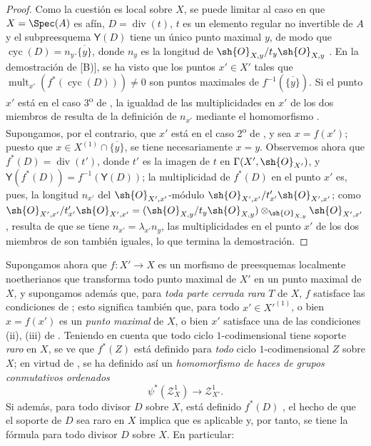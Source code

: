 \begin{proof}
Como la cuestión es local sobre $X$, se puede limitar al caso en que $X=\Spec(A)$ es afín, $D=\operatorname{div}(t)$, $t$ es un elemento regular no invertible de $A$ y el subpreesquema $\boldsymbol{\mathsf{Y}}(D)$  tiene un único punto maximal $y$, de modo que $\operatorname{cyc}(D)=n_y.\overline{\{y\}}$, donde $n_y$ es la longitud de $\sh{O}_{X,y}/t_y\sh{O}_{X,y}$ .
En la demostración de [B)], se ha visto que los puntos $x'\in X'$ tales que $\operatorname{mult}_{x'}(f^*(\operatorname{cyc}(D)))\neq0$ son puntos maximales de $f^{-1}(\overline{\{y\}})$.
Si el punto $x'$ está en el caso 3\textsuperscript{o} de , la igualdad de las multiplicidades en $x'$ de los dos miembros de  resulta de la definición de $n_{x'}$ mediante el homomorfismo .
Supongamos, por el contrario, que $x'$ está en el caso 2\textsuperscript{o} de , y sea $x=f(x')$;
puesto que $x\in X^{(1)}\cap\overline{\{y\}}$, se tiene necesariamente $x=y$.
Observemos ahora que $f^*(D)=\operatorname{div}(t')$, donde $t'$ es la imagen de $t$ en $\Gamma(X',\sh{O}_{X'})$, y $\boldsymbol{\mathsf{Y}}(f^*(D))=f^{-1}(\boldsymbol{\mathsf{Y}}(D))$;
la multiplicidad de $f^*(D)$ en el punto $x'$ es, pues, la longitud $n_{x'}$ del $\sh{O}_{X',x'}$-módulo $\sh{O}_{X',x'}/t'_{x'}\sh{O}_{X',x'}$;
como $\sh{O}_{X',x'}/t'_{x'}\sh{O}_{X',x'}=(\sh{O}_{X,y}/t_y\sh{O}_{X,y})\otimes_{\sh{O}_{X,y}}\sh{O}_{X',x'}$, resulta de  que se tiene $n_{x'}=\lambda_{x'}n_y$, las multiplicidades en el punto $x'$ de los dos miembros de  son también iguales, lo que termina la demostración.
\end{proof}

\begin{env}[21.10.5]
\label{IV.21.10.5}

Supongamos ahora que $f:X'\to X$ es un morfismo de preesquemas localmente noetherianos que transforma todo punto maximal de $X'$ en un punto maximal de $X$, y supongamos además que, para \emph{toda parte cerrada rara} $T$ de $X$, $f$ satisface las condiciones 
de ;
esto significa también que, para todo $x'\in X'^{(1)}$, o bien $x=f(x')$ es un \emph{punto maximal} de $X$, o bien $x'$ satisface una de las condiciones (ii), (iii) de .
Teniendo en cuenta que todo ciclo $1$-codimensional tiene soporte \emph{raro} en $X$, se ve que $f^*(Z)$ está definido para \emph{todo} ciclo $1$-codimensional $Z$ sobre $X$;
en virtud de , se ha definido así un \emph{homomorfismo de haces de grupos conmutativos ordenados}
\[
  \psi^*(\mathscr{Z}^1_X)\to\mathscr{Z}^1_{X'}.
\]
Si además, para todo divisor $D$ sobre $X$, está definido $f^*(D)$ , el hecho de que el soporte de $D$ sea raro en $X$  implica que  es aplicable y, por tanto, se tiene la fórmula  para todo divisor $D$ sobre $X$.
En particular:
\end{env}

